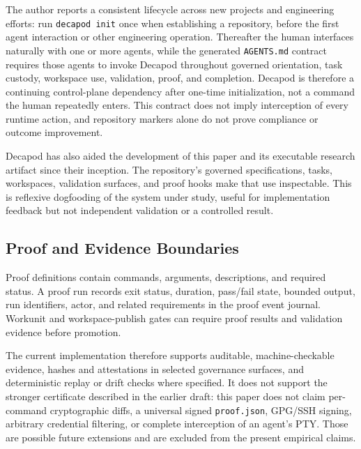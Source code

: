 The author reports a consistent lifecycle across new projects and engineering efforts: run \texttt{decapod init} once when establishing a repository, before the first agent interaction or other engineering operation. Thereafter the human interfaces naturally with one or more agents, while the generated \texttt{AGENTS.md} contract requires those agents to invoke Decapod throughout governed orientation, task custody, workspace use, validation, proof, and completion. Decapod is therefore a continuing control-plane dependency after one-time initialization, not a command the human repeatedly enters. This contract does not imply interception of every runtime action, and repository markers alone do not prove compliance or outcome improvement.

Decapod has also aided the development of this paper and its executable research artifact since their inception. The repository's governed specifications, tasks, workspaces, validation surfaces, and proof hooks make that use inspectable. This is reflexive dogfooding of the system under study, useful for implementation feedback but not independent validation or a controlled result.

\subsection{Proof and Evidence Boundaries}
Proof definitions contain commands, arguments, descriptions, and required status. A proof run records exit status, duration, pass/fail state, bounded output, run identifiers, actor, and related requirements in the proof event journal. Workunit and workspace-publish gates can require proof results and validation evidence before promotion.

The current implementation therefore supports auditable, machine-checkable evidence, hashes and attestations in selected governance surfaces, and deterministic replay or drift checks where specified. It does not support the stronger certificate described in the earlier draft: this paper does not claim per-command cryptographic diffs, a universal signed \texttt{proof.json}, GPG/SSH signing, arbitrary credential filtering, or complete interception of an agent's PTY. Those are possible future extensions and are excluded from the present empirical claims.
